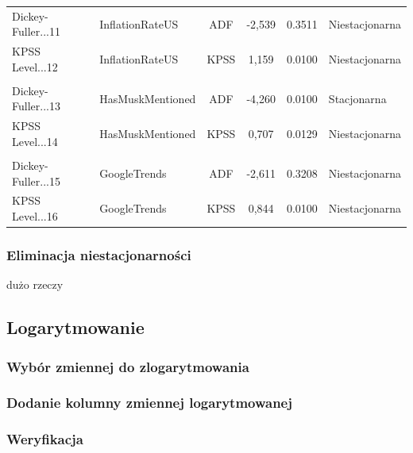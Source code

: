 \documentclass[
  11pt,
]{article}
\begin{document}
\begin{longtable}[t]{llcccl}
\hspace{1em}Dickey-Fuller...11 & InflationRateUS & ADF & -2,539 & 0.3511 & Niestacjonarna\\
\hspace{1em}KPSS Level...12 & InflationRateUS & KPSS & 1,159 & 0.0100 & Niestacjonarna\\
\addlinespace[0.3em]
\multicolumn{6}{l}{\textbf{HasMuskMentioned}}\\
\hspace{1em}Dickey-Fuller...13 & HasMuskMentioned & ADF & -4,260 & 0.0100 & Stacjonarna\\
\hspace{1em}KPSS Level...14 & HasMuskMentioned & KPSS & 0,707 & 0.0129 & Niestacjonarna\\
\addlinespace[0.3em]
\multicolumn{6}{l}{\textbf{GoogleTrends}}\\
\hspace{1em}Dickey-Fuller...15 & GoogleTrends & ADF & -2,611 & 0.3208 & Niestacjonarna\\
\hspace{1em}KPSS Level...16 & GoogleTrends & KPSS & 0,844 & 0.0100 & Niestacjonarna\\
\bottomrule
\end{longtable}
\endgroup{}

\subsubsection{Eliminacja
niestacjonarności}\label{eliminacja-niestacjonarnoux15bci}

dużo rzeczy

\subsection{Logarytmowanie}\label{logarytmowanie}

\subsubsection{Wybór zmiennej do
zlogarytmowania}\label{wybuxf3r-zmiennej-do-zlogarytmowania}

\subsubsection{Dodanie kolumny zmiennej
logarytmowanej}\label{dodanie-kolumny-zmiennej-logarytmowanej}

\subsubsection{Weryfikacja}\label{weryfikacja}
\end{document}
